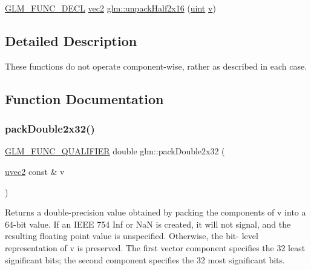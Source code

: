 \begin{DoxyCompactItemize}
\item 
\mbox{\hyperlink{setup_8hpp_ab2d052de21a70539923e9bcbf6e83a51}{G\+L\+M\+\_\+\+F\+U\+N\+C\+\_\+\+D\+E\+CL}} \mbox{\hyperlink{group__core__types_gaa1618f51db67eaa145db101d8c8431d8}{vec2}} \mbox{\hyperlink{group__core__func__packing_ga90be544929ed83fa7039208bbab8c0ba}{glm\+::unpack\+Half2x16}} (\mbox{\hyperlink{group__core__precision_ga4fd29415871152bfb5abd588334147c8}{uint}} \mbox{\hyperlink{glad_8h_a14cfbe2fc2234f5504618905b69d1e06}{v}})
\end{DoxyCompactItemize}


\subsection{Detailed Description}
These functions do not operate component-\/wise, rather as described in each case. 

\subsection{Function Documentation}
\mbox{\label{group__core__func__packing_gaf728fdfb98ce34da6f968d9f6bf154d7}} 
\subsubsection{\texorpdfstring{packDouble2x32()}{packDouble2x32()}}
{\footnotesize\ttfamily \mbox{\hyperlink{setup_8hpp_a33fdea6f91c5f834105f7415e2a64407}{G\+L\+M\+\_\+\+F\+U\+N\+C\+\_\+\+Q\+U\+A\+L\+I\+F\+I\+ER}} double glm\+::pack\+Double2x32 (\begin{DoxyParamCaption}\item[{\mbox{\hyperlink{group__core__types_gafd2041b45eff671aa8899d2c2835eee9}{uvec2}} const \&}]{v }\end{DoxyParamCaption})}

Returns a double-\/precision value obtained by packing the components of v into a 64-\/bit value. If an I\+E\+EE 754 Inf or NaN is created, it will not signal, and the resulting floating point value is unspecified. Otherwise, the bit-\/ level representation of v is preserved. The first vector component specifies the 32 least significant bits; the second component specifies the 32 most significant bits.

